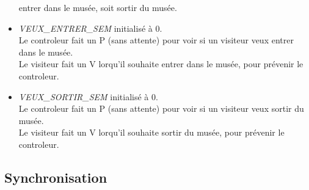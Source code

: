 \documentclass[a4paper,12pt,DIV=16]{scrreprt}
\begin{document}
\begin{itemize}
            entrer dans le musée, soit sortir du musée.
        \item \emph{VEUX\_ENTRER\_SEM} initialisé à 0.\\
            Le controleur fait un P (sans attente) pour voir si un visiteur veux entrer dans le musée.\\
            Le visiteur fait un V lorqu'il souhaite entrer dans le musée, pour prévenir le controleur.
        \item \emph{VEUX\_SORTIR\_SEM} initialisé à 0.\\
            Le controleur fait un P (sans attente) pour voir si un visiteur veux sortir du  musée.\\
            Le visiteur fait un V lorqu'il souhaite sortir du musée, pour prévenir le controleur.
    \end{itemize}
    \newpage

    \subsection*{Synchronisation}
\end{document}
